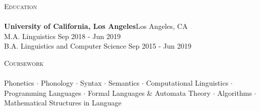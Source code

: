 \documentclass[]{article}
\newcommand{\lineunder} {
	\vspace*{-8pt} \\
	\hspace*{-18pt} \hrulefill \\
}
\newcommand{\header} [1] {
	{\hspace*{-18pt}\vspace*{6pt} \textsc{#1}}
	\vspace*{-6pt} \lineunder
}
\begin{document}
	
	\header{Education}
	\textbf{University of California, Los Angeles}\hfill Los Angeles, CA\\
	M.A. Linguistics \hfill Sep 2018 - Jun 2019\\
	\vspace{1mm}
	B.A. Linguistics and Computer Science \hfill Sep 2015 - Jun 2019\\
	\vspace{1mm}
	\vspace{1mm}
	
	\header{Coursework}
	Phonetics $\cdot$ Phonology $\cdot$ Syntax $\cdot$ Semantics $\cdot$ Computational Linguistics $\cdot$ Programming Languages $\cdot$ Formal Languages \& Automata Theory $\cdot$ Algorithms $\cdot$ Mathematical Structures in Language
	\vspace*{10mm}
	
\end{document}
